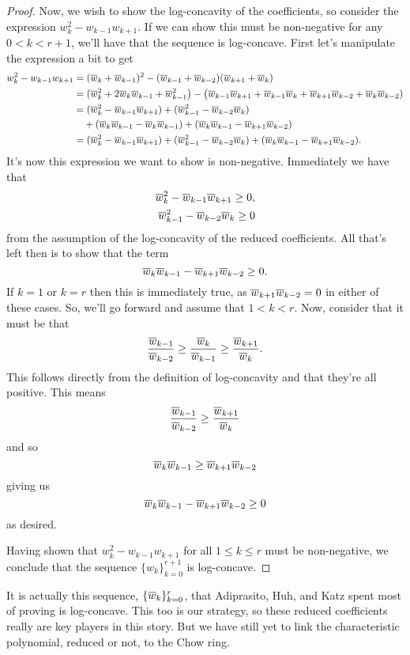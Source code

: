 \documentclass[12pt,oneside]{../../sfsuthesis}
\begin{document}
\begin{proof}
    Now, we wish to show the log-concavity of the coefficients, so consider the expression \( w_k^2 - w_{k-1}w_{k+1} \).
    If we can show this must be non-negative for any \( 0 < k < r+1 \), we'll have that the sequence is log-concave.
    First let's manipulate the expression a bit to get
    \begin{align*}
        w_k^2 - w_{k-1}w_{k+1} & = (\overline{w}_k + \overline{w}_{k-1})^2 - (\overline{w}_{k-1} + \overline{w}_{k-2})(\overline{w}_{k+1} + \overline{w}_{k})                                                                     \\
                               & = (\overline{w}_k^2 + 2\overline{w}_k \overline{w}_{k-1} + \overline{w}_{k-1}^2 \big) - \big( \overline{w}_{k-1} \overline{w}_{k+1} + \overline{w}_{k-1}\overline{w}_{k} + \overline{w}_{k+1}\overline{w}_{k-2} + \overline{w}_{k} \overline{w}_{k-2}) \\
                               & = (\overline{w}_k^2 - \overline{w}_{k-1}\overline{w}_{k+1}) + (\overline{w}_{k-1}^2 - \overline{w}_{k-2}\overline{w}_{k})                                                                        \\
                               & \quad + (\overline{w}_k \overline{w}_{k-1} - \overline{w}_k \overline{w}_{k-1}) + (\overline{w}_k \overline{w}_{k-1} - \overline{w}_{k+1} \overline{w}_{k-2} )                                                     \\
                               & = (\overline{w}_k^2 - \overline{w}_{k-1}\overline{w}_{k+1}) + (\overline{w}_{k-1}^2 - \overline{w}_{k-2}\overline{w}_{k}) + (\overline{w}_k \overline{w}_{k-1} - \overline{w}_{k+1} \overline{w}_{k-2} ).
    \end{align*}
    It's now this expression we want to show is non-negative.
    Immediately we have that
    \begin{align*}
        \overline{w}_k^2 - \overline{w}_{k-1}\overline{w}_{k+1} \geq 0, \\
        \overline{w}_{k-1}^2 - \overline{w}_{k-2}\overline{w}_{k} \geq 0
    \end{align*}
    from the assumption of the log-concavity of the reduced coefficients.
    All that's left then is to show that the term
    \[
        \overline{w}_k \overline{w}_{k-1} - \overline{w}_{k+1} \overline{w}_{k-2} \geq 0.
    \]
    If \( k = 1 \) or \( k = r \) then this is immediately true, as \(\overline{w}_{k+1} \overline{w}_{k-2} = 0\) in either of these cases.
    So, we'll go forward and assume that \( 1 < k < r \).
    Now, consider that it must be that
    \[
        \frac{\overline{w}_{k-1}}{\overline{w}_{k-2}} \geq \frac{\overline{w}_k}{\overline{w}_{k-1}} \geq \frac{\overline{w}_{k+1}}{\overline{w}_k}.
    \]
    This follows directly from the definition of log-concavity and that they're all positive.
    This means
    \[
        \frac{\overline{w}_{k-1}}{\overline{w}_{k-2}} \geq \frac{\overline{w}_{k+1}}{\overline{w}_k}
    \]
    and so
    \[
        \overline{w}_k \overline{w}_{k-1} \geq \overline{w}_{k+1} \overline{w}_{k-2}
    \]
    giving us
    \[
        \overline{w}_k \overline{w}_{k-1} - \overline{w}_{k+1} \overline{w}_{k-2} \geq 0
    \]
    as desired.

    Having shown that \( w_k^2 - w_{k-1}w_{k+1} \) for all \( 1 \leq k \leq r \) must be non-negative, we conclude that the sequence \( \{ w_k \}_{k=0}^{r+1} \) is log-concave.

\end{proof}
It is actually this sequence, \(\{\overline{w}_k\}_{k=0}^r \), that Adiprasito, Huh, and Katz spent most of \cite{adiprasitoHodgeTheoryCombinatorial2018} proving is log-concave.
This too is our strategy, so these reduced coefficients really are key players in this story.
But we have still yet to link the characteristic polynomial, reduced or not, to the Chow ring.
\end{document}
